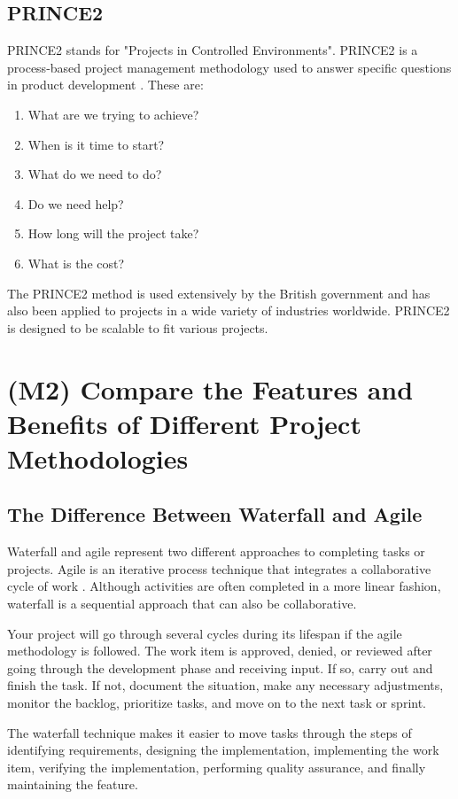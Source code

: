 \documentclass{article}
\begin{document}
\subsection{PRINCE2}
PRINCE2 stands for "Projects in Controlled Environments". PRINCE2 is a process-based project management methodology used to answer specific questions in product development \cite{purple}. These are:
\begin{enumerate}
    \item What are we trying to achieve?
    \item When is it time to start?
    \item What do we need to do?
    \item Do we need help?
    \item How long will the project take?
    \item What is the cost?
\end{enumerate}

The PRINCE2 method is used extensively by the British government and has also been applied to projects in a wide variety of industries worldwide. PRINCE2 is designed to be scalable to fit various projects.

\section{(M2) Compare the Features and Benefits of Different Project Methodologies}

\subsection{The Difference Between Waterfall and Agile}
Waterfall and agile represent two different approaches to completing tasks or projects. Agile is an iterative process technique that integrates a collaborative cycle of work \cite{diffs}. Although activities are often completed in a more linear fashion, waterfall is a sequential approach that can also be collaborative.

Your project will go through several cycles during its lifespan if the agile methodology is followed. The work item is approved, denied, or reviewed after going through the development phase and receiving input. If so, carry out and finish the task. If not, document the situation, make any necessary adjustments, monitor the backlog, prioritize tasks, and move on to the next task or sprint.

The waterfall technique makes it easier to move tasks through the steps of identifying requirements, designing the implementation, implementing the work item, verifying the implementation, performing quality assurance, and finally maintaining the feature.
\end{document}
